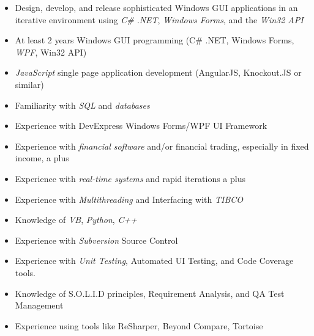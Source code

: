 \begin{framed}\noindent
\begin{itemize}[nosep,leftmargin=*]
\item Design, develop, and release sophisticated Windows GUI applications in an iterative environment using \emph{C\#} \emph{.NET}, \emph{Windows Forms}, and the \emph{Win32 API}
\item At least 2 years Windows GUI programming (C\# .NET, Windows Forms, \emph{WPF}, Win32 API)
\item \emph{JavaScript} single page application development (AngularJS, Knockout.JS or similar)
\item Familiarity with \emph{SQL} and \emph{databases}
\item Experience with DevExpress Windows Forms/WPF  UI Framework
\item Experience with \emph{financial software} and/or financial trading, especially in fixed income, a plus
\item Experience with \emph{real-time systems} and rapid iterations a plus
\item Experience with \emph{Multithreading} and Interfacing with \emph{TIBCO}
\item Knowledge of \emph{VB}, \emph{Python}, \emph{C++}
\item Experience with \emph{Subversion} Source Control
\item Experience with \emph{Unit Testing}, Automated UI Testing, and Code Coverage tools.
\item Knowledge of S.O.L.I.D principles, Requirement Analysis, and QA Test Management
\item Experience using tools like ReSharper, Beyond Compare,  Tortoise
\end{itemize}
\end{framed}

